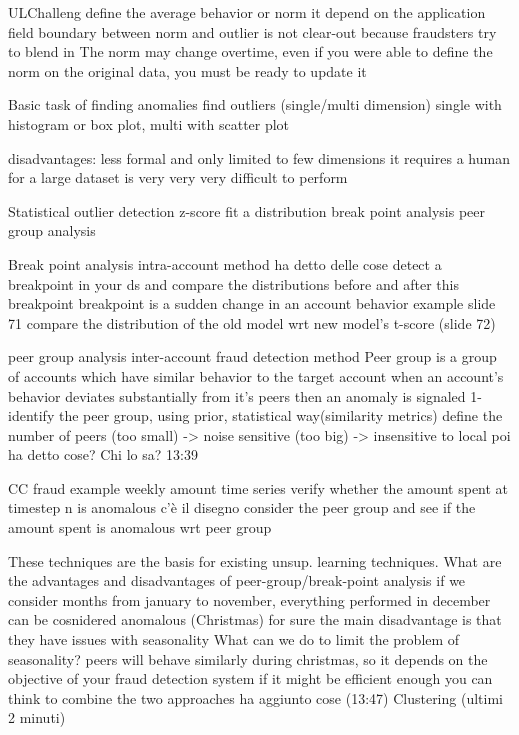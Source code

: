     ULChalleng
        define the average behavior or norm 
            it depend on the application field 
            boundary between norm and outlier is not clear-out because fraudsters try to blend in 
            The norm may change overtime, even if you were able to define the norm on the original data, you must be ready to update it
    
    Basic task of finding anomalies 
        find outliers (single/multi dimension) single with histogram or box plot, multi with scatter plot 

        disadvantages:
            less formal and only limited to few dimensions 
            it requires a human 
            for a large dataset is very very very difficult to perform 

    Statistical outlier detection 
        z-score 
        fit a distribution 
        break point analysis 
        peer group analysis

        Break point analysis
            intra-account method 
                ha detto delle cose 
                detect a breakpoint in your ds and compare the distributions before and after this breakpoint 
                breakpoint is a sudden change in an account behavior 
                example slide 71
                    compare the distribution of the old model wrt new model's 
                    t-score (slide 72)
        
        peer group analysis 
            inter-account fraud detection method 
            Peer group is a group of accounts which have similar behavior to the target account 
            when an account's behavior deviates substantially from it's peers then an anomaly is signaled 
                1- identify the peer group, using prior, statistical way(similarity metrics)
                    define the number of peers (too small) -> noise sensitive 
                                                (too big) -> insensitive to local
                poi ha detto cose? Chi lo sa? 13:39 

            CC fraud example 
                weekly amount time series 
                    verify whether the amount spent at timestep n is anomalous 
                    c'è il disegno 
                    consider the peer group and see if the amount spent is anomalous wrt peer group 

        These techniques are the basis for existing unsup. learning techniques.
            What are the advantages and disadvantages of peer-group/break-point analysis 
                if we consider months from january to november, everything performed in december can be cosnidered anomalous (Christmas)
                for sure the main disadvantage is that they have issues with seasonality
                What can we do to limit the problem of seasonality?
                    peers will behave similarly during christmas, so it depends on the objective of your fraud detection system
                    if it might be efficient enough you can think to combine the two approaches 
                    ha aggiunto cose (13:47)
    Clustering (ultimi 2 minuti)
\fi